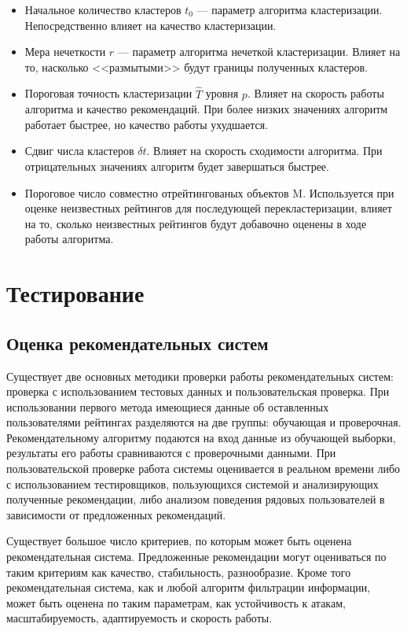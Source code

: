 \documentclass[a4paper, 12pt]{article} %
\begin{document}
\begin{itemize}
\item Начальное количество кластеров $t_{0}$ --- параметр алгоритма кластеризации. Непосредственно влияет на качество кластеризации. 
\item Мера нечеткости $r$ --- параметр алгоритма нечеткой кластеризации. Влияет на то, насколько <<размытыми>> будут границы полученных кластеров.
\item Пороговая точность кластеризации $\hat{T}$ уровня $p$. Влияет на скорость работы алгоритма и качество рекомендаций. При более низких значениях алгоритм работает быстрее, но качество работы ухудшается.
\item Сдвиг числа кластеров $\delta t$. Влияет на скорость сходимости алгоритма. При отрицательных значениях алгоритм будет завершаться быстрее.
\item Пороговое число совместно отрейтингованых объектов M. Используется при оценке неизвестных рейтингов для последующей перекластеризации, влияет на то, сколько неизвестных рейтингов будут добавочно оценены в ходе работы алгоритма\cite{itercf}.

\end{itemize}

\section{Тестирование}


\subsection{Оценка рекомендательных систем}

Существует две основных методики проверки работы рекомендательных систем: проверка с использованием тестовых данных и пользовательская проверка. При использовании первого метода имеющиеся данные об оставленных пользователями рейтингах разделяются на две группы: обучающая и проверочная. Рекомендательному алгоритму подаются на вход данные из обучающей выборки, результаты его работы сравниваются с проверочными данными. При пользовательской проверке работа системы оценивается в реальном времени либо с использованием тестировщиков, пользующихся системой и анализирующих полученные рекомендации, либо анализом поведения рядовых пользователей в зависимости от предложенных рекомендаций.

Существует большое число критериев, по которым может быть оценена рекомендательная система. Предложенные рекомендации могут оцениваться по таким критериям как качество, стабильность, разнообразие. Кроме того рекомендательная система, как и любой алгоритм фильтрации информации, может быть оценена по таким параметрам, как устойчивость к атакам, масштабируемость, адаптируемость и скорость работы.
\end{document}
